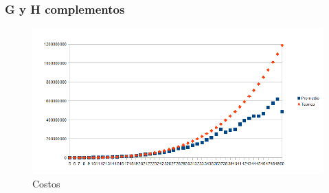 \subsubsection{G y H complementos}

\begin{figure}[H]
	\centering
	\includegraphics[scale=0.8]{grasp-tiempos-H-complemento.png}
\caption{Costos}
\end{figure}
